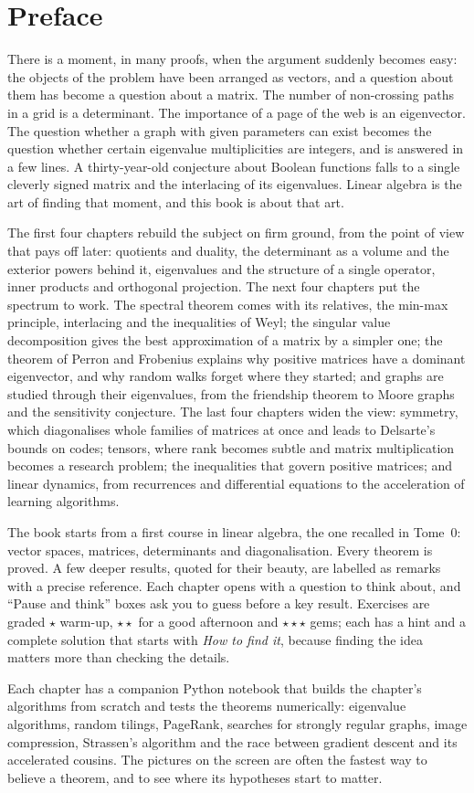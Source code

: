 \chapter*{Preface}
There is a moment, in many proofs, when the argument suddenly becomes easy: the objects of the problem have
been arranged as vectors, and a question about them has become a question about a matrix. The number of
non-crossing paths in a grid is a determinant. The importance of a page of the web is an eigenvector. The
question whether a graph with given parameters can exist becomes the question whether certain eigenvalue
multiplicities are integers, and is answered in a few lines. A thirty-year-old conjecture about Boolean
functions falls to a single cleverly signed matrix and the interlacing of its eigenvalues. Linear algebra is
the art of finding that moment, and this book is about that art.

The first four chapters rebuild the subject on firm ground, from the point of view that pays off later:
quotients and duality, the determinant as a volume and the exterior powers behind it, eigenvalues and the
structure of a single operator, inner products and orthogonal projection. The next four chapters put the
spectrum to work. The spectral theorem comes with its relatives, the min-max principle, interlacing and the
inequalities of Weyl; the singular value decomposition gives the best approximation of a matrix by a simpler
one; the theorem of Perron and Frobenius explains why positive matrices have a dominant eigenvector, and why
random walks forget where they started; and graphs are studied through their eigenvalues, from the friendship
theorem to Moore graphs and the sensitivity conjecture. The last four chapters widen the view: symmetry, which
diagonalises whole families of matrices at once and leads to Delsarte's bounds on codes; tensors, where rank
becomes subtle and matrix multiplication becomes a research problem; the inequalities that govern positive
matrices; and linear dynamics, from recurrences and differential equations to the acceleration of learning
algorithms.

The book starts from a first course in linear algebra, the one recalled in Tome~0: vector spaces, matrices,
determinants and diagonalisation. Every theorem is proved. A few deeper results, quoted for their beauty, are
labelled as remarks with a precise reference. Each chapter opens with a question to think about, and ``Pause and
think'' boxes ask you to guess before a key result. Exercises are graded \textbf{$\star$} warm-up,
\textbf{$\star\star$} for a good afternoon and \textbf{$\star\star\star$} gems; each has a hint and a complete
solution that starts with \emph{How to find it}, because finding the idea matters more than checking the details.

Each chapter has a companion Python notebook that builds the chapter's algorithms from scratch and tests the
theorems numerically: eigenvalue algorithms, random tilings, PageRank, searches for strongly regular graphs,
image compression, Strassen's algorithm and the race between gradient descent and its accelerated cousins.
The pictures on the screen are often the fastest way to believe a theorem, and to see where its hypotheses
start to matter.
